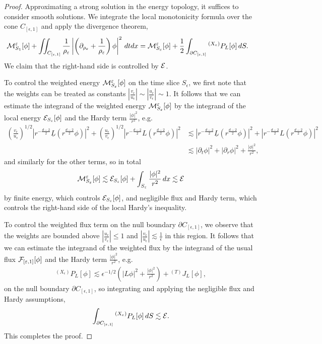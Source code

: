 \begin{proof}
	Approximating a strong solution in the energy topology, it suffices to consider smooth solutions. We integrate the local monotonicity formula over the cone $C_{[\epsilon, 1]}$ and apply the divergence theorem, 
		\begin{align*}
			\mathcal M_{S_{1}}^\varepsilon [\phi] + \iint_{C_{[\varepsilon, 1]}} \frac1{\rho_\varepsilon} \left| \left( \partial_{\rho_\varepsilon} + \frac1{\rho_\varepsilon} \right) \phi\right|^2 \, dt dx 
				&=\mathcal M_{S_{\varepsilon}}^\varepsilon [\phi] + \frac12 \int_{\partial C_{[\varepsilon, 1]}} {^{(X_\varepsilon)}}P_L [\phi] \, dS.
		\end{align*}
	We claim that the right-hand side is controlled by $\mathcal E$.
	
	To control the weighted energy $\mathcal M^\varepsilon_{S_\varepsilon} [\phi]$ on the time slice $S_\epsilon$, we first note that the weights can be treated as constants $|\tfrac{v_\epsilon}{u_\epsilon}| \sim |\tfrac{u_\epsilon}{v_\epsilon}| \sim 1$. It follows that we can estimate the integrand of the weighted energy $\mathcal M^\varepsilon_{S_\varepsilon} [\phi]$ by the integrand of the local energy $\mathcal E_{S_\varepsilon} [\phi]$ and the Hardy term $\tfrac{|\phi|^2}{r^2}$, e.g.
		\begin{align*}
			\left(\frac{v_\epsilon}{u_\epsilon} \right)^{1/2} \left| r^{-\frac{d - 2}{2}} \underline L \left( r^{\frac{d - 2}{2}} \phi \right)\right|^2 + \left( \frac{u_\epsilon}{v_\epsilon} \right)^{1/2} \left| r^{-\frac{d - 2}{2}} L \left( r^{\frac{d - 2}{2}} \phi \right)\right|^2 
				&\lesssim  \left| r^{-\frac{d - 2}{2}} \underline L \left( r^{\frac{d - 2}{2}} \phi \right)\right|^2 + \left| r^{-\frac{d - 2}{2}} L \left( r^{\frac{d - 2}{2}} \phi \right)\right|^2 \\
				&\lesssim |\partial_t \phi|^2 + |\partial_r \phi|^2 + \frac{|\phi|^2}{r^2},
		\end{align*}
	and similarly for the other terms, so in total
		\[
			\mathcal M^\varepsilon_{S_\varepsilon} [\phi] \lesssim \mathcal E_{S_\varepsilon} [\phi] + \int_{S_\varepsilon} \frac{|\phi|^2}{r^2} \, dx \lesssim \mathcal E
		\]	
	by finite energy, which controls $\mathcal E_{S_\varepsilon} [\phi]$, and negligible flux and Hardy term, which controls the right-hand side of the local Hardy's inequality. 

	To control the weighted flux term on the null boundary $\partial C_{[\epsilon, 1]}$, we observe that the weights are bounded above $|\tfrac{u_\epsilon}{v_\epsilon}| \leq 1$ and $|\tfrac{v_\epsilon}{u_\epsilon}| \lesssim \tfrac1\epsilon$ in this region. It follows that we can estimate the integrand of the weighted flux by the integrand of the usual flux $\mathcal F_{[\varepsilon, 1]}[\phi]$ and the Hardy term $\tfrac{|\phi|^2}{r^2}$, e.g.
		\begin{align*}
			^{(X_\epsilon)} P_L [\phi] \lesssim \epsilon^{-1/2} \left( |L\phi|^2 + \frac{|\phi|^2}{r^2} \right) + {^{(T)}} J_L [\phi],
		\end{align*}
	on the null boundary $\partial C_{[\epsilon, 1]}$, so integrating and applying the negligible flux and Hardy assumptions, 
		\[
			\int_{\partial C_{[\varepsilon, 1]}} {^{(X_\varepsilon)}} P_L [\phi] \, dS \lesssim \mathcal E.
		\]	
	This completes the proof. 	
\end{proof}


